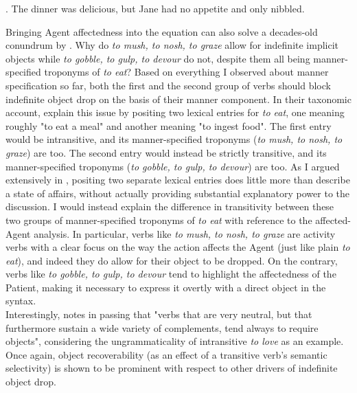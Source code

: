 \ex. \label{affectedmanner} The dinner was delicious, but Jane had no appetite and only nibbled.

Bringing Agent affectedness into the equation can also solve a decades-old conundrum by \textcite{FellbaumKegl1989taxonomic}. Why do \textit{to mush, to nosh, to graze} allow for indefinite implicit objects while \textit{to gobble, to gulp, to devour} do not, despite them all being manner-specified troponyms of \textit{to eat}? Based on everything I observed about manner specification so far, both the first and the second group of verbs should block indefinite object drop on the basis of their manner component. In their taxonomic account, \textcite{FellbaumKegl1989taxonomic} explain this issue by positing two lexical entries for \textit{to eat}, one meaning roughly "to eat a meal" and another meaning "to ingest food". The first entry would be intransitive, and its manner-specified troponyms (\textit{to mush, to nosh, to graze}) are too. The second entry would instead be strictly transitive, and its manner-specified troponyms (\textit{to gobble, to gulp, to devour}) are too. As I argued extensively in , positing two separate lexical entries does little more than describe a state of affairs, without actually providing substantial explanatory power to the discussion. I would instead explain the difference in transitivity between these two groups of manner-specified troponyms of \textit{to eat} with reference to the affected-Agent analysis. In particular, verbs like \textit{to mush, to nosh, to graze} are activity verbs with a clear focus on the way the action affects the Agent (just like plain \textit{to eat}), and indeed they do allow for their object to be dropped. On the contrary, verbs like \textit{to gobble, to gulp, to devour} tend to highlight the affectedness of the Patient, making it necessary to express it overtly with a direct object in the syntax.\\
Interestingly, \textcite[207]{Rice1988} notes in passing that "verbs that are very neutral, but that furthermore sustain a wide variety of complements, tend always to require objects", considering the ungrammaticality of intransitive \textit{to love} as an example. Once again, object recoverability (as an effect of a transitive verb's semantic selectivity) is shown to be prominent with respect to other drivers of indefinite object drop.



